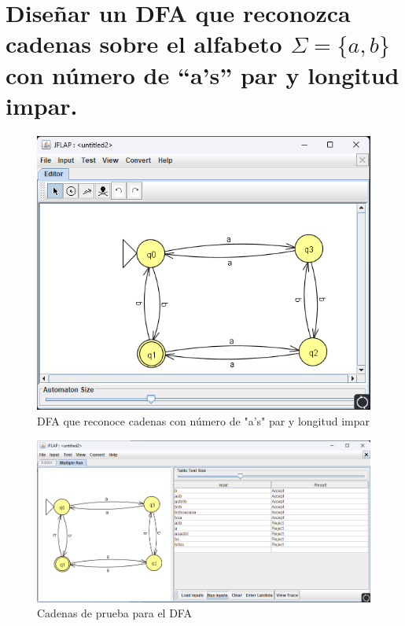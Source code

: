 \documentclass[11pt]{report}
\begin{document}
\section{Diseñar un DFA que reconozca cadenas sobre el alfabeto $\Sigma = \{a, b\}$ con número de “a's” par y longitud impar.}
\begin{figure}[H]
  \centering
  \includegraphics[scale=0.7]{img/DFA_04.png}
  \caption{DFA que reconoce cadenas con número de "a's" par y longitud impar}
\end{figure}

\begin{figure}[H]
  \centering
  \includegraphics[scale=0.65]{img/DFA_04_test.png}
  \caption{Cadenas de prueba para el DFA}
\end{figure}

\newpage
\end{document}
